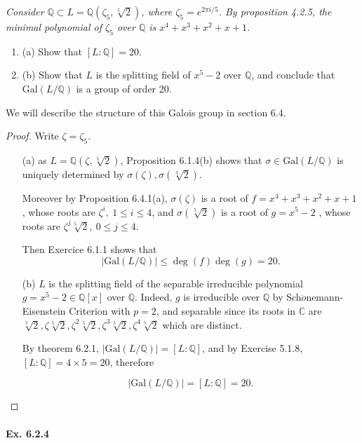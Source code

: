 \documentclass[11pt,a4paper]{article}
\newcommand{\be} {\begin{enumerate}}
\newcommand{\ee} {\end{enumerate}}
\newcommand{\Q}{\mathbb{Q}}
\newcommand{\C}{\mathbb{C}}
\newcommand{\Gal}{\mathrm{Gal}}
\begin{document}
{\it Consider $\Q \subset L = \Q(\zeta_5, \sqrt[5]{2})$, where $\zeta_5 = e^{2 \pi i /5}$. By proposition 4.2.5, the minimal polynomial of $\zeta_5$ over $\Q$ is $x^4+x^3+x^2+x+1$.
\be
\item[(a)] Show that $[L:\Q] = 20$.
\item[(b)] Show that $L$ is the splitting field of $x^5-2$ over $\Q$, and conclude that $\Gal(L/\Q)$ is a group of order 20.
\ee
We will describe the structure of this Galois group in section 6.4.
}

\begin{proof}
Write $\zeta = \zeta_5$.
\begin{enumerate}
\item[(a)]
as $L = \Q(\zeta,\sqrt[5]{2})$, Proposition 6.1.4(b) shows that $\sigma \in \mathrm{Gal}(L/\Q)$ is uniquely determined by $\sigma(\zeta),\sigma(\sqrt[3]{2})$.

Moreover by Proposition 6.4.1(a), $\sigma(\zeta)$ is a root of $f = x^4+x^3+x^2+x+1$, whose roots are $\zeta^i,\ 1\leq i \leq 4$, and $\sigma(\sqrt[5]{2})$ is a root of $g = x^5-2$ , whose roots are $\zeta^j \sqrt[5]{2},\ 0 \leq j \leq 4$.

Then Exercice 6.1.1 shows that $$\vert \mathrm{Gal}(L/\Q)\vert \leq \deg(f)\deg(g)=20.$$

\item[(b)]
$L$ is the splitting field of the separable irreducible polynomial $g = x^5-2\in \Q[x]$ over $\Q$. Indeed,  $g$ is  irreducible over $\Q$ by Sch$\ddot o$nemann-Eisenstein Criterion with $p=2$, and separable since its roots in $\C$ are $\sqrt[5]{2}, \zeta\sqrt[5]{2},\zeta^2 \sqrt[5]{2},\zeta^3 \sqrt[5]{2},\zeta^4\sqrt[5]{2}$ which are distinct.

By theorem 6.2.1, $\vert \mathrm{Gal}(L/\Q)\vert = [L:\Q]$, and by Exercise 5.1.8, $[L:\Q]=4 \times 5 = 20$, therefore

$$\vert \mathrm{Gal}(L/\Q)\vert = [L:\Q]=20.$$
\end{enumerate}
\end{proof}

\paragraph{Ex. 6.2.4}
\end{document}
